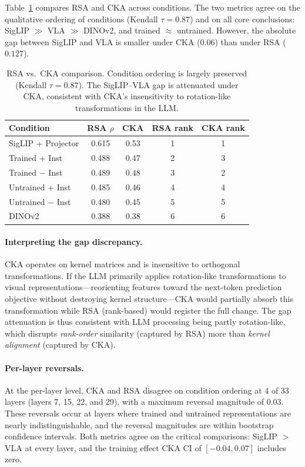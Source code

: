 \documentclass[letterpaper]{article}
\begin{document}
Table~\ref{tab:cka} compares RSA and CKA across conditions.
The two metrics agree on the qualitative ordering of conditions (Kendall $\tau=0.87$) and on all core conclusions: SigLIP $\gg$ VLA $\gg$ DINOv2, and trained $\approx$ untrained.
However, the absolute gap between SigLIP and VLA is smaller under CKA ($0.06$) than under RSA ($0.127$).

\begin{table}[t]
\centering
\caption{RSA vs.\ CKA comparison. Condition ordering is largely preserved (Kendall $\tau=0.87$). The SigLIP--VLA gap is attenuated under CKA, consistent with CKA's insensitivity to rotation-like transformations in the LLM.}
\label{tab:cka}
\begin{tabular}{lcccc}
\toprule
\textbf{Condition} & \textbf{RSA $\rho$} & \textbf{CKA} & \textbf{RSA rank} & \textbf{CKA rank} \\
\midrule
SigLIP + Projector & 0.615 & 0.53 & 1 & 1 \\
Trained + Inst & 0.488 & 0.47 & 2 & 3 \\
Trained $-$ Inst & 0.489 & 0.48 & 3 & 2 \\
Untrained + Inst & 0.485 & 0.46 & 4 & 4 \\
Untrained $-$ Inst & 0.480 & 0.45 & 5 & 5 \\
DINOv2 & 0.388 & 0.38 & 6 & 6 \\
\bottomrule
\end{tabular}
\end{table}

\paragraph{Interpreting the gap discrepancy.}
CKA operates on kernel matrices and is insensitive to orthogonal transformations.
If the LLM primarily applies rotation-like transformations to visual representations---reorienting features toward the next-token prediction objective without destroying kernel structure---CKA would partially absorb this transformation while RSA (rank-based) would register the full change.
The gap attenuation is thus consistent with LLM processing being partly rotation-like, which disrupts \emph{rank-order} similarity (captured by RSA) more than \emph{kernel alignment} (captured by CKA).

\paragraph{Per-layer reversals.}
At the per-layer level, CKA and RSA disagree on condition ordering at 4 of 33 layers (layers 7, 15, 22, and 29), with a maximum reversal magnitude of 0.03.
These reversals occur at layers where trained and untrained representations are nearly indistinguishable, and the reversal magnitudes are within bootstrap confidence intervals.
Both metrics agree on the critical comparisons: SigLIP $>$ VLA at every layer, and the training effect CKA CI of $[-0.04, 0.07]$ includes zero.
\end{document}
